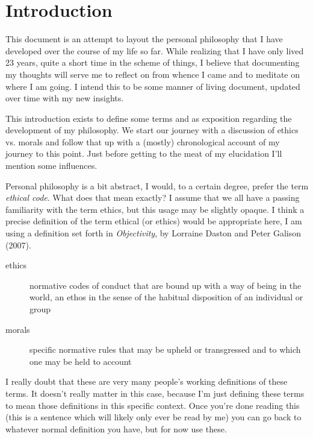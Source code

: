 \documentclass[./butidigress.tex]{subfiles}
\begin{document}
\chapter{Introduction}\label{chap:intro}
\newpage

\setcounter{footnote}{0}

This document is an attempt to layout the personal philosophy that I have developed over the course of my life so far.
While realizing that I have only lived 23 years, quite a short time in the scheme of things, I believe that documenting my thoughts will serve me to reflect on from whence I came and to meditate on where I am going.
I intend this to be some manner of living document, updated over time with my new insights.

This introduction exists to define some terms and as exposition regarding the development of my philosophy.
We start our journey with a discussion of ethics vs. morals and follow that up with a (mostly) chronological account of my journey to this point.
Just before getting to the meat of my elucidation I'll mention some influences.

\label{sec:ethics}
Personal philosophy is a bit abstract, I would, to a certain degree, prefer the term \emph{ethical code}.
What does that mean exactly?
I assume that we all have a passing familiarity with the term ethics, but this usage may be slightly opaque.
I think a precise definition of the term ethical (or ethics) would be appropriate here, I am using a definition set forth in \textit{Objectivity}, by Lorraine Daston and Peter Galison (2007).\autocite{objectivity}
\begin{description}
    \item [ethics] normative codes of conduct that are bound up with a way of being in the world, an ethos in the sense of the habitual disposition of an individual or group
    \item [morals] specific normative rules that may be upheld or transgressed and to which one may be held to account
\end{description}

I really doubt that these are very many people's working definitions of these terms.
It doesn't really matter in this case, because I'm just defining these terms to mean those definitions in this specific context.
Once you're done reading this (this is a sentence which will likely only ever be read by me) you can go back to whatever normal definition you have, but for now use these.
\end{document}
